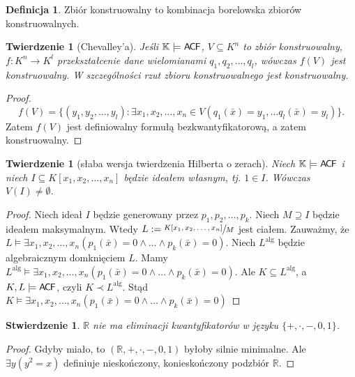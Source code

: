 \documentclass{article}
\newcommand{\R}{\mathbb{R}}
\newcommand{\K}{\mathbb{K}}
\theoremstyle{plain}
\newtheorem{tw}[thm]{Twierdzenie}
\newtheorem{stw}[thm]{Stwierdzenie}
\theoremstyle{definition}
\newtheorem{df}[thm]{Definicja}
\theoremstyle{remark}
\newcommand{\ACF}{\mathsf{A \mkern-2.0mu C \mkern-1.1mu F}}
\begin{document}
\begin{df}
	 Zbiór konstruowalny to kombinacja borelowska zbiorów konstruowalnych.
\end{df}

\begin{tw}[Chevalley'a]
	 Jeśli $\K \models \ACF$, $V \subseteq K^n$ to zbiór konstruowalny, $f \colon K^n \to K^l$ przekształcenie dane wielomianami $q_1, q_2, \ldots, q_l$,
	 wówczas $f(V)$ jest konstruowalny.
	 W szczególności rzut zbioru konstruowalnego jest konstruowalny.
\end{tw}
\begin{proof}
	\[
		f(V) = \{ (y_1, y_2, \ldots, y_l ) \colon \exists x_1, x_2, \ldots, x_n \in V (q_1(\bar{x}) = y_1, \ldots q_l(\bar{x}) = y_l)  \}.
	\]
	Zatem $ f(V) $ jest definiowalny formułą bezkwantyfikatorową, a zatem konstruowalny.
\end{proof}

\begin{tw}[słaba wersja twierdzenia Hilberta o zerach]
	Niech $  \K \models \ACF $ i niech $  I \subseteq K[x_1, x_2, \ldots, x_n ] $ będzie ideałem własnym, tj. $  1 \in I $.
	Wówczas $  V(I) \neq \emptyset $.
\end{tw}
\begin{proof}
	 Niech ideał $I$ będzie generowany przez $  p_1, p_2, \ldots, p_k  $.
	 Niech $  M \supseteq I$ będzie ideałem maksymalnym.
	 Wtedy $L :=  \sfrac{K[x_1, x_2, \ldots, x_n ]}{M} $ jest ciałem.
	 Zauważmy, że $  L \models \exists x_1, x_2, \ldots, x_n (p_1(\bar{x}) = 0 \wedge \ldots \wedge p_k(\bar{x}) = 0) $.
	 Niech $ L^{\text{alg}} $ będzie algebraicznym domknięciem $ L $.
	Mamy $  L^{\text{alg}} \models \exists x_1, x_2, \ldots, x_n (p_1(\bar{x}) = 0 \wedge \ldots \wedge p_k(\bar{x}) = 0) $.
	Ale $  K \subseteq L^{\text{alg}} $, a $ K , L \models \ACF $, czyli $ K \prec L^{\text{alg}} $.
	Stąd $  K \models \exists x_1, x_2, \ldots, x_n (p_1(\bar{x}) = 0 \wedge \ldots \wedge p_k(\bar{x}) = 0) $
\end{proof}


\begin{stw}
	 $ \R $ nie ma eliminacji kwantyfikatorów w języku $ \{+, \cdot, -, 0, 1\} $. %
\end{stw}
\begin{proof}
	Gdyby miało, to $ (\R, +, \cdot, -, 0, 1) $ byłoby silnie minimalne.
	Ale $\exists y (y^2 = x) $ definiuje nieskończony, konieskończony podzbiór $ \R $.
\end{proof}
\end{document}
